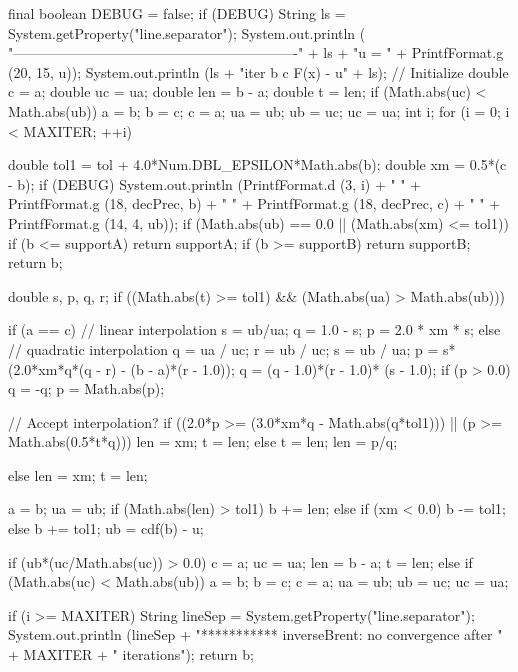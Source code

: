 \begin{code}
\begin{hide}
{      final boolean DEBUG = false;
      if (DEBUG) {
          String ls = System.getProperty("line.separator");
          System.out.println (
             "-------------------------------------------------------------"
              + ls + "u = " + PrintfFormat.g (20, 15, u));
          System.out.println
           (ls + "iter           b                  c               F(x) - u" + ls);
      }
      // Initialize
      double c = a;
      double uc = ua;
      double len = b - a;
      double t = len;
      if (Math.abs(uc) < Math.abs(ub)) {
            a = b; b = c; c = a;
            ua = ub; ub = uc; uc = ua;
      }
      int i;
      for (i = 0; i < MAXITER; ++i) {
         double tol1 = tol + 4.0*Num.DBL_EPSILON*Math.abs(b);
         double xm = 0.5*(c - b);
         if (DEBUG) {
            System.out.println (PrintfFormat.d (3, i) + "  " +
                PrintfFormat.g (18, decPrec, b) + "  " +
                PrintfFormat.g (18, decPrec, c) + "  " +
                PrintfFormat.g (14, 4, ub));
         }
         if (Math.abs(ub) == 0.0 || (Math.abs(xm) <= tol1)) {
            if (b <= supportA) return supportA;
            if (b >= supportB) return supportB;
            return b;
         }

         double s, p, q, r;
         if ((Math.abs(t) >= tol1) && (Math.abs(ua) > Math.abs(ub))) {
            if (a == c) {
               // linear interpolation
               s = ub/ua;
               q = 1.0 - s;
               p = 2.0 * xm * s;
            } else {
               // quadratic interpolation
               q = ua / uc;
               r = ub / uc;
               s = ub / ua;
               p = s*(2.0*xm*q*(q - r) - (b - a)*(r - 1.0));
               q = (q - 1.0)*(r - 1.0)* (s - 1.0);
            }
            if (p > 0.0)
               q = -q;
            p = Math.abs(p);

            // Accept interpolation?
            if ((2.0*p >= (3.0*xm*q - Math.abs(q*tol1))) ||
                (p >= Math.abs(0.5*t*q))) {
               len = xm;
               t = len;
            } else {
               t = len;
               len = p/q;
            }

         } else {
            len = xm;
            t = len;
         }

         a = b;
         ua = ub;
         if (Math.abs(len) > tol1)
            b += len;
         else if (xm < 0.0)
            b -= tol1;
         else
            b += tol1;
         ub = cdf(b) - u;

         if (ub*(uc/Math.abs(uc)) > 0.0) {
            c = a;
            uc = ua;
            len = b - a;
            t = len;
         } else if (Math.abs(uc) < Math.abs(ub)) {
            a = b; b = c; c = a;
            ua = ub; ub = uc; uc = ua;
         }
      }
      if (i >= MAXITER) {
         String lineSep = System.getProperty("line.separator");
         System.out.println (lineSep +
           "*********** inverseBrent:   no convergence after " + MAXITER +
           " iterations");
      }
      return b;
   }\end{hide}
\end{code}
